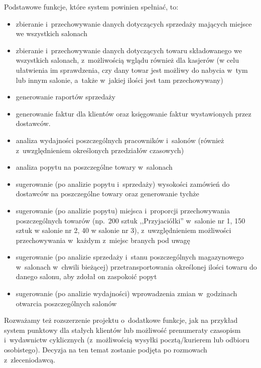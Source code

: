 Podstawowe funkcje, które system powinien spełniać, to:
\begin{itemize}
    \item zbieranie i~przechowywanie danych dotyczących sprzedaży mających miejsce we wszystkich salonach
    \item zbieranie i~przechowywanie danych dotyczących towaru składowanego we wszystkich salonach,
    z~możliwością wglądu również dla kasjerów (w celu ułatwienia im sprawdzenia, czy dany towar jest
    możliwy do nabycia w~tym lub innym salonie, a~także w~jakiej ilości jest tam przechowywany)
    \item generowanie raportów sprzedaży
    \item generowanie faktur dla klientów oraz księgowanie faktur wystawionych przez dostawców.
    \item analiza wydajności poszczególnych pracowników i~salonów (również z~uwzględnieniem określonych przedziałów czasowych)
    \item analiza popytu na poszczególne towary w~salonach
    \item sugerowanie (po analizie popytu i~sprzedaży) wysokości zamówień do dostawców na poszczególne towary oraz generowanie tychże
    \item sugerowanie (po analizie popytu) miejsca i~proporcji przechowywania poszczególnych
    towarów (np.\ 200 sztuk ,,Przyjaciółki'' w~salonie nr 1, 150 sztuk w salonie nr 2, 40 w salonie
    nr 3), z~uwzględnieniem możliwości przechowywania w~każdym z~miejsc branych pod uwagę
    \item sugerowanie (po analizie sprzedaży i~stanu poszczególnych magazynowego w~salonach w~chwili bieżącej)
    przetransportowania określonej ilości towaru do danego salonu, aby zdołał on zaspokoić popyt
    \item sugerowanie (po analizie wydajności) wprowadzenia zmian w~godzinach otwarcia poszczególnych salonów
\end{itemize}

Rozważamy też rozszerzenie projektu o~dodatkowe funkcje, jak na przykład system punktowy dla
stałych klientów lub możliwość prenumeraty czasopism i~wydawnictw cyklicznych (z~możliwością
wysyłki pocztą/kurierem lub odbioru osobistego). Decyzja na ten temat zostanie podjęta po
rozmowach z~zleceniodawcą.

